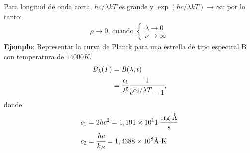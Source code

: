 \documentclass[../main]{subfiles}
\begin{document}
\begin{multicols}{2}
Para longitud de onda corta, $hc/\lambda kT$ es grande y $\exp(hc/\lambda kT)\rightarrow \infty$; por lo tanto:
\begin{align}
    \rho \rightarrow 0\text{, cuando }\begin{cases}
        \lambda \rightarrow 0\\
        \nu \rightarrow \infty
    \end{cases}
\end{align}
\textbf{Ejemplo}: Representar la curva de Planck para una estrella de tipo espectral B con temperatura de $14000 K$.
\begin{align}
    B_\lambda (T)&=B(\lambda, t)\\
    &=\cfrac{c_1}{\lambda^5}\cfrac{1}{e^{\displaystyle c_2/\lambda T}-1},
\end{align}
donde:
\begin{align}
    &c_1=2hc^2=1,191 \times 10^11 \: \frac{\text{erg \normalfont\AA}}{s}\\
    &c_2=\cfrac{hc}{k_B}=1,4388 \times 10^8 \text{\normalfont\AA-K}
\end{align}


\end{multicols}
\end{document}
